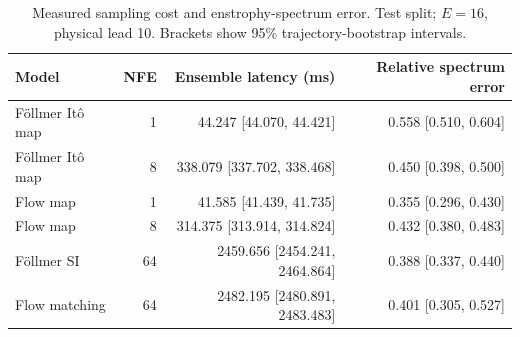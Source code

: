 \begin{table}[t]
\centering
\small
\setlength{\tabcolsep}{3pt}
\caption{Measured sampling cost and enstrophy-spectrum error. Test split; $E=16$, physical lead 10. Brackets show 95\% trajectory-bootstrap intervals.}
\label{tab:map-cost}
\begin{tabular}{lrrr}
\toprule
Model & NFE & Ensemble latency (ms) & Relative spectrum error \\
\midrule
Föllmer Itô map & 1 & 44.247 [44.070, 44.421] & 0.558 [0.510, 0.604] \\
Föllmer Itô map & 8 & 338.079 [337.702, 338.468] & 0.450 [0.398, 0.500] \\
\addlinespace
Flow map & 1 & 41.585 [41.439, 41.735] & 0.355 [0.296, 0.430] \\
Flow map & 8 & 314.375 [313.914, 314.824] & 0.432 [0.380, 0.483] \\
\addlinespace
Föllmer SI & 64 & 2459.656 [2454.241, 2464.864] & 0.388 [0.337, 0.440] \\
\addlinespace
Flow matching & 64 & 2482.195 [2480.891, 2483.483] & 0.401 [0.305, 0.527] \\
\bottomrule
\end{tabular}
\end{table}
